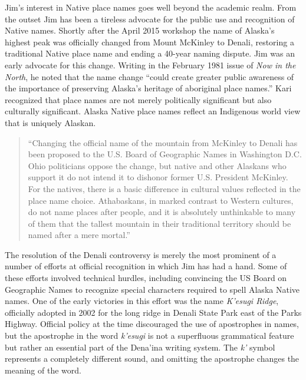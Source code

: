 Jim's interest in Native place names goes well beyond the academic realm. From the outset Jim has been a tireless advocate for the public use and recognition of Native names. Shortly after the April 2015 workshop the name of Alaska's highest peak was officially changed from Mount McKinley to Denali, restoring a traditional Native place name and ending a 40-year naming dispute. Jim was an early advocate for this change. Writing in the February 1981 issue of \textit{Now in the North}, he noted that the name change ``could create greater public awareness of the importance of preserving Alaska's heritage of aboriginal place names.'' Kari recognized that place names are not merely politically significant but also culturally significant. Alaska Native place names reflect an Indigenous world view that is uniquely Alaskan.

\begin{quote}
``Changing the official name of the mountain from McKinley to Denali has been proposed to the U.S. Board of Geographic Names in Washington D.C. Ohio politicians oppose the change, but native and other Alaskans who support it do not intend it to dishonor former U.S. President McKinley. For the natives, there is a basic difference in cultural values reflected in the place name choice. Athabaskans, in marked contrast to Western cultures, do not name places after people, and it is absolutely unthinkable to many of them that the tallest mountain in their traditional territory should be named after a mere mortal.'' \citep[17]{kari1991}
\end{quote}

The resolution of the Denali controversy is merely the most prominent of a number of efforts at official recognition in which Jim has had a hand. Some of these efforts involved technical hurdles, including convincing the US Board on Geographic Names to recognize special characters required to spell Alaska Native names. One of the early victories in this effort was the name \textit{K'esugi Ridge}, officially adopted in 2002 for the long ridge in Denali State Park east of the Parks Highway. Official policy at the time discouraged the use of apostrophes in names, but the apostrophe in the word \textit{k'esugi} is not a superfluous grammatical feature but rather an essential part of the Dena'ina  writing system. The \textit{k'} symbol represents a completely different sound, and omitting the apostrophe changes the meaning of the word.


